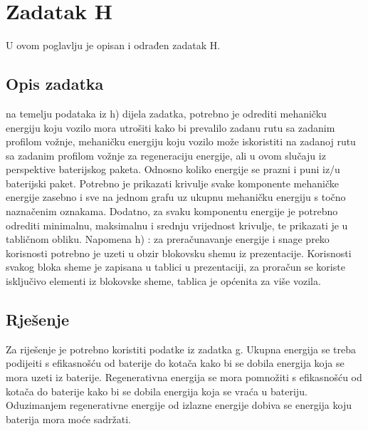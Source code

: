 \chapter{Zadatak H} \label{ch:h}

U ovom poglavlju je opisan i odrađen zadatak H.

\section{Opis zadatka} \label{sec:h:opis}
na temelju podataka iz h) dijela zadatka, potrebno je odrediti mehaničku energiju koju vozilo mora
utrošiti kako bi prevalilo zadanu rutu sa zadanim profilom vožnje, mehaničku energiju koju vozilo
može iskoristiti na zadanoj rutu sa zadanim profilom vožnje za regeneraciju energije, ali u ovom
slučaju iz perspektive baterijskog paketa. Odnosno koliko energije se prazni i puni iz/u baterijski
paket. Potrebno je prikazati krivulje svake komponente mehaničke energije zasebno i sve na jednom
grafu uz ukupnu mehaničku energiju s točno naznačenim oznakama. Dodatno, za svaku komponentu
energije je potrebno odrediti minimalnu, maksimalnu i srednju vrijednost krivulje, te prikazati je u
tabličnom obliku.
Napomena h) : za preračunavanje energije i snage preko korisnosti potrebno je uzeti u obzir
blokovsku shemu iz prezentacije. Korisnosti svakog bloka sheme je zapisana u tablici u prezentaciji,
za proračun se koriste isključivo elementi iz blokovske sheme, tablica je općenita za više vozila.

\section{Rješenje} \label{sec:h:rjesenje}

Za riješenje je potrebno koristiti podatke iz zadatka g. Ukupna energija se treba podijeiti 
s efikasnošću od baterije do kotača kako bi se dobila energija koja se mora uzeti iz baterije.
Regenerativna energija se mora pomnožiti s efikasnošću od kotača do baterije kako bi se dobila
energija koja se vraća u bateriju. Oduzimanjem regenerativne energije od izlazne energije dobiva
se energija koju baterija mora moće sadržati.

